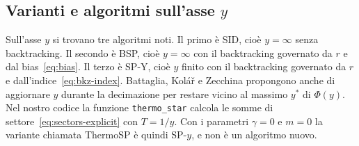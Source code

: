 \subsection{Varianti e algoritmi sull'asse $y$}

Sull'asse $y$ si trovano tre algoritmi noti.
Il primo è SID, cioè $y=\infty$ senza backtracking.
Il secondo è BSP, cioè $y=\infty$ con il backtracking governato da $r$ e dal bias~\eqref{eq:bias}.
Il terzo è SP-Y, cioè $y$ finito con il backtracking governato da $r$ e dall'indice~\eqref{eq:bkz-index}.
Battaglia, Kolář e Zecchina propongono anche di aggiornare $y$ durante la decimazione per restare vicino al massimo $y^*$ di $\Phi(y)$.
Nel nostro codice la funzione \texttt{thermo\_star} calcola le somme di settore~\eqref{eq:sectors-explicit} con $T=1/y$.
Con i parametri $\gamma=0$ e $m=0$ la variante chiamata ThermoSP è quindi SP-$y$, e non è un algoritmo nuovo.
